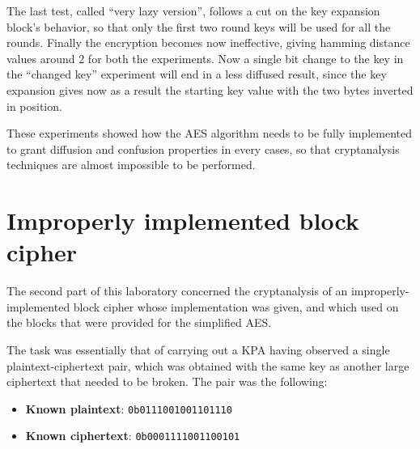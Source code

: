 \documentclass[12pt]{article}
\begin{document}
The last test, called ``very lazy version'', follows a cut on the key expansion block's behavior, so that only the first two round keys will be used for all the rounds. Finally the encryption becomes now ineffective, giving hamming distance values around {\color{blue}2} for both the experiments. Now a single bit change to the key in the ``changed key'' experiment will end in a less diffused result, since the key expansion gives now as a result the starting key value with the two bytes inverted in position.

These experiments showed how the AES algorithm needs to be fully implemented to grant diffusion and confusion properties in every cases, so that cryptanalysis techniques are almost impossible to be performed.

\begin{table}[h!]
    \centering
    \caption{Average hamming distance between ciphetexts}
\end{table}


\section{Improperly implemented block cipher}
\label{sec:03}

The second part of this laboratory concerned the cryptanalysis of an improperly-implemented block cipher whose implementation was given, and which used on the blocks that were provided for the simplified AES.\@

The task was essentially that of carrying out a KPA having observed a single plaintext-ciphertext pair, which was obtained with the same key as another large ciphertext that needed to be broken.
The pair was the following:

\begin{itemize}
   \item \textbf{Known plaintext}: \verb|0b0111001001101110|
   \item \textbf{Known ciphertext}: \verb|0b0001111001100101| 
\end{itemize}
\end{document}
